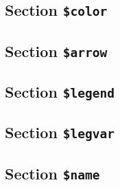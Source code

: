 \documentclass{report}
\begin{document}



\subsection{Section {\tt \$color}}




\subsection{Section {\tt \$arrow}}




\subsection{Section {\tt \$legend}}




\subsection{Section {\tt \$legvar}}




\subsection{Section {\tt \$name}}










\end{document}

